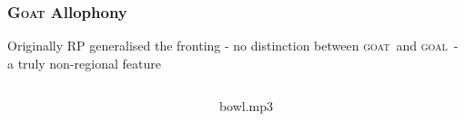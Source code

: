 \documentclass[
xcolor=table,
PHONON=true]
{beamer}
\newcommand{\scs}{\textsc}
\newcommand{\goat}{\textsc{goat}~}
\newcommand{\goal}{\textsc{goal}~}
\begin{document}
	\begin{frame}
		\frametitle{\scs{Goat} Allophony}
		Originally RP generalised the fronting - no distinction between \goat and \goal - a truly non-regional feature \citep{Sampson1985}
			\begin{columns}
				\begin{column}{0.5\textwidth}
				\end{column}
				\begin{column}{0.5\textwidth}
					{bowl.mp3}
				\end{column}
			\end{columns}
	\end{frame}
	
\end{document}
